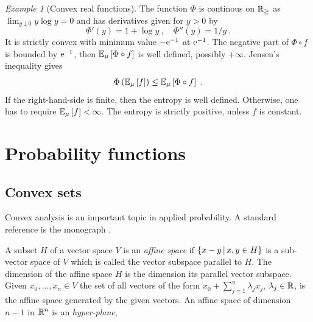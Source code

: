 \documentclass[12pt,a4paper]{amsart}
\theoremstyle{plain}%
\theoremstyle{definition}
\theoremstyle{remark}
\newtheorem{example}{Example}
\begin{document}
\begin{example}[Convex real functions]
The function $\Phi$ is continous
on $\mathbb{R}_\geq$ as $\lim_{y \downarrow 0} y \log y = 0$ and has
derivatives given for $y > 0$ by
\begin{equation*}
  \Phi'(y) = 1 + \log y \ , \quad \Phi''(y)= 1/y \ .  
\end{equation*}
It is strictly convex with minimum value $-\mathrm{e}^{-1}$ at
$\mathrm{e}^{-1}$. The negative part of $\Phi\circ f$ is bounded by
$\mathrm{e}^{-1}$, then $\operatorname{\mathbb E}_{\mu}\left[\Phi\circ f\right]$ is well defined,
possibly $+\infty$. Jensen's inequality gives
\begin{equation*}
  \Phi\left(\operatorname{\mathbb E}_{\mu}\left[f\right]\right) \leq \operatorname{\mathbb E}_{\mu}\left[\Phi\circ f\right] \ .
\end{equation*}
If the right-hand-side is finite, then the entropy is well
defined. Otherwise, one has to require $\operatorname{\mathbb E}_{\mu}\left[f\right] < \infty$. The
entropy is strictly positive, unless $f$ is constant.
\end{example}

\section{Probability functions}

\subsection{Convex sets}
\label{sec:aside:-convex-set}

Convex analysis is an important topic in applied probability. A
standard reference is the monograph \cite{barvinok:2002}.

A subset $H$ of a vector space $V$ is an \emph{affine space} if
$\left\{x-y \, \middle| \, x,y \in H \right\}$ is a sub-vector space of $V$ which is called
the vector subspace parallel to $H$. The dimension of the affine space
$H$ is the dimension its parallel vector subspace. Given
$x_0,\dots,x_n \in V$ the set of all vectors of the form
$x_0 + \sum_{j=1}^n \lambda_j x_j$, $\lambda_j \in \mathbb{R}$, is the
affine space generated by the given vectors. An affine space of
dimension $n-1$ in $\mathbb{R}^n$ is an \emph{hyper-plane},
\end{document}
